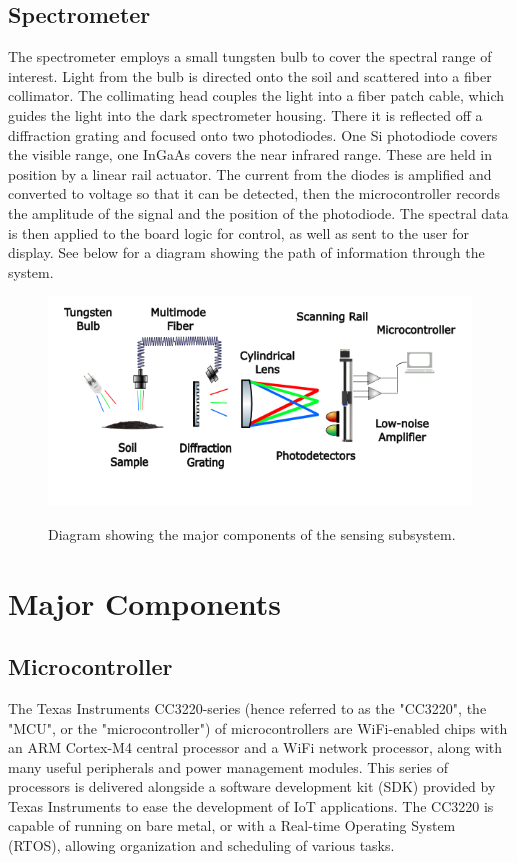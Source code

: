 \documentclass[journal]{IEEEtran}
\begin{document}
\subsection{Spectrometer} 
The spectrometer employs a small tungsten bulb to cover the spectral range of interest. Light from the bulb 
is directed onto the soil and scattered into a fiber collimator. The collimating head couples the light into 
a fiber patch cable, which guides the light into the dark spectrometer housing. There it is reflected off a 
diffraction grating and focused onto two photodiodes. One Si photodiode covers the visible range, one InGaAs 
covers the near infrared range. These are held in position by a linear rail actuator. The current from the 
diodes is amplified and converted to voltage so that it can be detected, then the microcontroller records the 
amplitude of the signal and the position of the photodiode. The spectral data is then applied to the board logic 
for control, as well as sent to the user for display. See below for a diagram showing the path of information 
through the system.
\begin{figure}[H]
    \centering
    \includegraphics[scale=0.5]{images/Schematic Diagram 2.png}
    \label{fig:sensing-block}
    \caption{Diagram showing the major components of the sensing subsystem.}
\end{figure}
\section{Major Components} \label{sec:major-components}
\subsection{Microcontroller}
The Texas Instruments CC3220-series (hence referred to as the "CC3220", the "MCU", or the "microcontroller") of microcontrollers are WiFi-enabled chips with an ARM Cortex-M4 central processor and a WiFi network processor, along with many useful peripherals and power management modules. This series of processors is delivered alongside a software development kit (SDK) provided by Texas Instruments to ease the development of IoT applications. The CC3220 is capable of running on bare metal, or with a Real-time Operating System (RTOS), allowing organization and scheduling of various tasks.
\end{document}
